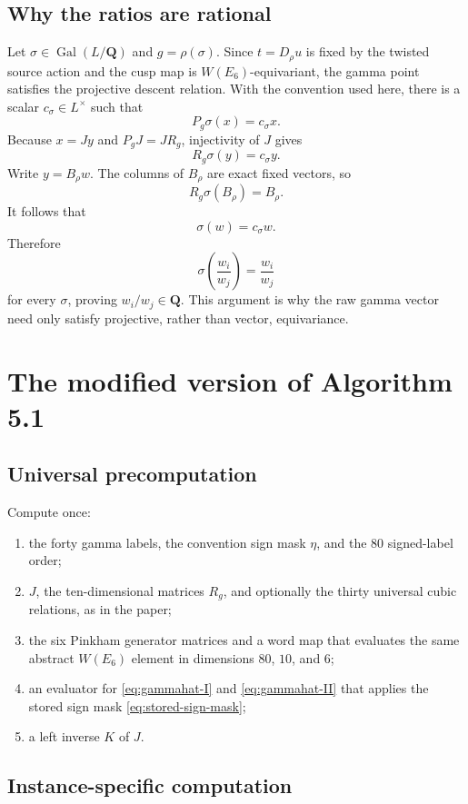 \documentclass[11pt]{article}
\newcommand{\QQ}{\mathbf{Q}}
\newcommand{\Gal}{\operatorname{Gal}}
\begin{document}
\subsection{Why the ratios are rational}

Let $\sigma\in\Gal(L/\QQ)$ and $g=\rho(\sigma)$.  Since
$t=D_\rho u$ is fixed by the twisted source action and the cusp map is
$W(E_6)$-equivariant, the gamma point satisfies the projective descent relation.
With the convention used here, there is a scalar $c_\sigma\in L^\times$ such that
\[
  P_g\sigma(x)=c_\sigma x.
\]
Because $x=Jy$ and $P_gJ=JR_g$, injectivity of $J$ gives
\[
  R_g\sigma(y)=c_\sigma y.
\]
Write $y=B_\rho w$.  The columns of $B_\rho$ are exact fixed vectors, so
\[
  R_g\sigma(B_\rho)=B_\rho.
\]
It follows that
\[
  \sigma(w)=c_\sigma w.
\]
Therefore
\[
  \sigma\left(\frac{w_i}{w_j}\right)=\frac{w_i}{w_j}
\]
for every $\sigma$, proving $w_i/w_j\in\QQ$.  This argument is why the raw gamma
vector need only satisfy projective, rather than vector, equivariance.

\section{The modified version of Algorithm 5.1}
\label{sec:modified-algorithm}

\subsection{Universal precomputation}

Compute once:

\begin{enumerate}
\item the forty gamma labels, the convention sign mask $\eta$, and the $80$
signed-label order;
\item $J$, the ten-dimensional matrices $R_g$, and optionally the thirty universal
cubic relations, as in the paper;
\item the six Pinkham generator matrices and a word map that evaluates the same
abstract $W(E_6)$ element in dimensions $80$, $10$, and $6$;
\item an evaluator for \eqref{eq:gammahat-I} and \eqref{eq:gammahat-II}
that applies the stored sign mask \eqref{eq:stored-sign-mask};
\item a left inverse $K$ of $J$.
\end{enumerate}

\subsection{Instance-specific computation}
\end{document}
